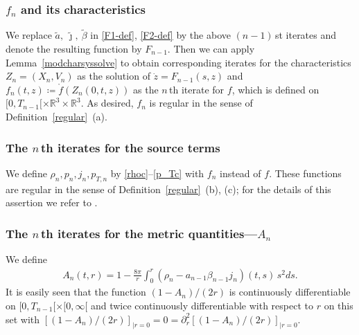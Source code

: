 \documentclass[11pt]{article}
\def\R{\mathbb R}
\begin{document}
\subsubsection{$f_n$ and its characteristics}
%
%
We replace
$\tilde a,\ \tilde\jmath,\ \tilde \beta$ in \eqref{F1-def}, \eqref{F2-def}
by the above $(n-1)\,$st
iterates and denote the resulting function by $F_{n-1}$. Then we can apply
Lemma~\ref{modcharsyssolve} to obtain corresponding iterates for the
characteristics $Z_n=(X_n,V_n)$ as the solution of
$\dot z = F_{n-1}(s,z)$ and $f_n(t,z)\coloneqq\mathring{f}(Z_n(0,t,z))$
as the $n\,$th iterate
for $f$, which is defined on $[0,T_{n-1}[\times\R^3\times\R^3$.
As desired, $f_n$ is regular in the sense of Definition~\ref{regular}~(a).
%
%
\subsubsection{The $n\,$th iterates for the source terms}
%
%
We define $\rho_n, p_n, j_n, p_{T,n}$
by \eqref{rhoc}--\eqref{p_Tc} with $f_n$ instead of $f$. These functions
are regular in the sense of Definition~\ref{regular}~(b), (c);
for the details of this assertion we refer to \cite[Lemma 6.8]{GB}.
%
%
\subsubsection{The $n\,$th iterates for the metric quantities---$A_n$}
%
%
We define
\begin{align}\label{Andef}
  A_n(t,r) = 1 - \frac{8\pi}{r}
  \int_0^r \left(\rho_n - a_{n-1}\beta_{n-1} j_n\right)(t,s)\, s^2 ds.
\end{align}
It is easily seen that the function
$(1-A_n)/(2r)$ is continuously differentiable on $[0,T_{n-1}[\times [0,\infty[$
and twice continuously differentiable with respect to $r$ on this set
with  $[(1-A_n)/(2r)]_{|r=0} = 0 =\partial_r^2 [(1-A_n)/(2r)]_{|r=0}$.
%
%
\end{document}
